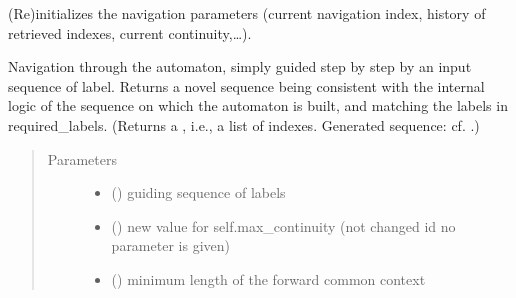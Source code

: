 \documentclass[letterpaper,10pt,english]{sphinxmanual}
\begin{document}
\begin{fulllineitems}

\begin{fulllineitems}
\label{\detokenize{index:ModelNavigator.FactorOracleNavigator.reinit_navigation_param}}
(Re)initializes the navigation parameters (current navigation index, history of retrieved indexes, current continuity,…).

\end{fulllineitems}


\begin{fulllineitems}
\label{\detokenize{index:ModelNavigator.FactorOracleNavigator.simply_guided_navigation}}
Navigation through the automaton, simply guided step by step by an input sequence of label.
Returns a novel sequence being consistent with the internal logic of the sequence on which the automaton is built, and matching the labels in required\_labels.
(Returns a , i.e., a list of indexes. Generated sequence: cf. .)
\begin{quote}\begin{description}
\item[{Parameters}] \leavevmode\begin{itemize}
\item {} 
 () \textendash{} guiding sequence of labels

\item {} 
 () \textendash{} new value for self.max\_continuity (not changed id no parameter is given)

\item {} 
 () \textendash{} minimum length of the forward common context


\end{itemize}
\end{description}
\end{quote}
\end{fulllineitems}
\end{fulllineitems}
\end{document}
